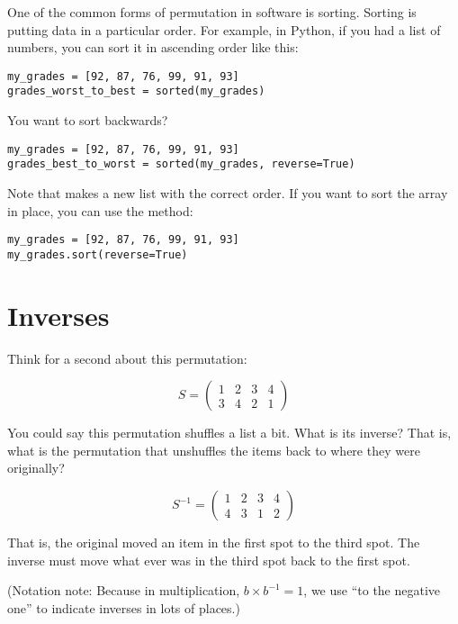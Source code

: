 One of the common forms of permutation in software is sorting.
Sorting is putting data in a particular order. For example, in Python,
if you had a list of numbers, you can sort it in ascending order like
this:

\begin{Verbatim}
my_grades = [92, 87, 76, 99, 91, 93]
grades_worst_to_best = sorted(my_grades)
\end{Verbatim}

You want to sort backwards?

\begin{Verbatim}
my_grades = [92, 87, 76, 99, 91, 93]
grades_best_to_worst = sorted(my_grades, reverse=True)
\end{Verbatim}

Note that  makes a new list with the correct
order. If you want to sort the array in place, you can use the
 method:

\begin{Verbatim}
my_grades = [92, 87, 76, 99, 91, 93]
my_grades.sort(reverse=True)
\end{Verbatim}

\section{Inverses}

Think for a second about this permutation:

$$S = \begin{pmatrix}
  1 & 2 & 3 & 4 \\
  3 & 4 & 2 & 1
\end{pmatrix}$$

You could say this permutation shuffles a list a bit.  What is its
inverse? That is, what is the permutation that unshuffles the items
back to where they were originally?

$$S^{-1} = \begin{pmatrix}
  1 & 2 & 3 & 4 \\
  4 & 3 & 1 & 2
\end{pmatrix}$$

That is, the original moved an item in the first spot to the third
spot. The inverse must move what ever was in the third spot back to
the first spot.

(Notation note: Because in multiplication, $b \times b^{-1} = 1$, we
use ``to the negative one'' to indicate inverses in lots of places.)


